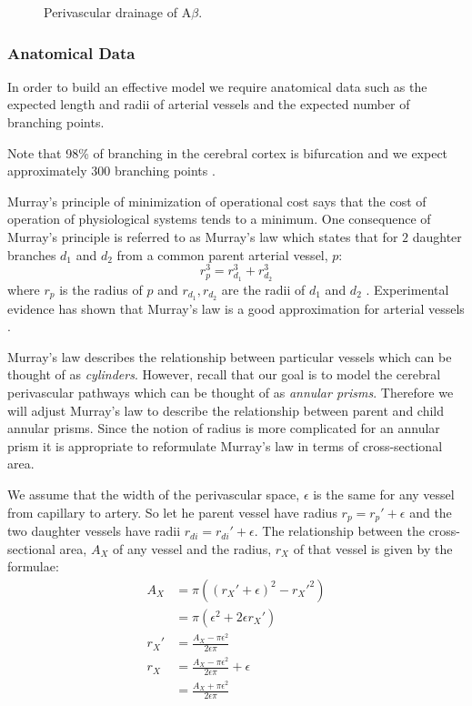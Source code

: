 \documentclass[12pt]{article} %
\theoremstyle{definition}
\begin{document}
\begin{figure}[H]

              \centering
                \caption{Perivascular drainage of A$\beta$.}
\end{figure}
\subsubsection{Anatomical Data}


 
In order to build an effective model we require anatomical data such as the expected length
 and radii of arterial vessels and the expected number of branching points.     

Note that 98\% of branching in the cerebral cortex is bifurcation and we expect approximately 
300 branching points \cite{Cassot}. 

Murray's principle of minimization of operational cost says that the cost of operation of
 physiological systems tends to a minimum.  One consequence of Murray’s principle is referred 
to as Murray's law which states that for $2$ daughter branches $d_{1}$ and $d_{2}$ from a 
common parent arterial vessel, $p$: 
\[r_{p}^{3} = r_{d_{1}}^{3} + r_{d_{2}}^{3}\]
where $r_{p}$ is the radius of $p$ and $r_{d_{1}},r_{d_{2}}$ are the radii of $d_{1}$ and 
$d_{2}$ \cite{Murray}.
Experimental evidence has shown that Murray's law is a good approximation for 
arterial vessels \cite{}.

Murray's law describes the relationship between particular vessels which can be thought of as 
\emph{cylinders}.  However, recall that our goal is to model the cerebral perivascular pathways
which can be thought of as \emph{annular prisms}.  Therefore we will adjust Murray's law to describe 
the relationship between parent and child annular prisms.  Since the notion of radius is more 
complicated for an annular prism it is appropriate to reformulate Murray's law in terms of 
cross-sectional area.   

We assume that the width of the perivascular space, $\epsilon$ is the same for any vessel from capillary to
 artery.  So let he parent vessel have radius $r_{p} = r_{p}' + \epsilon$ and the two 
daughter vessels have radii $r_{di} = r_{di}' + \epsilon$.
The relationship between the cross-sectional area, $A_{X}$ of any vessel and the radius, $r_{X}$ 
of that vessel is given by the formulae:
\begin{align}
 A_{X} &= \pi((r_{X}' + \epsilon)^{2} - r_{X}'^{2})\\
 &= \pi(\epsilon^{2} + 2\epsilon r_{X}')\\
 r_{X}' &= \frac{A_{X} - \pi\epsilon^{2}}{2\epsilon\pi}\\
 r_{X} &=  \frac{A_{X} - \pi\epsilon^{2}}{2\epsilon\pi} + \epsilon \\
 &= \frac{A_{X} + \pi\epsilon^{2}}{2\epsilon\pi}
\end{align}
\end{document}
